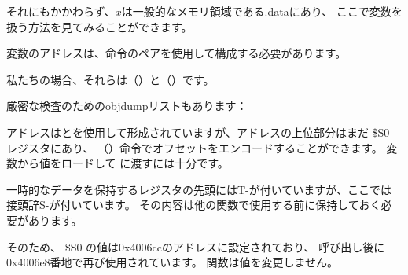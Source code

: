 それにもかかわらず、$x$は一般的なメモリ領域である.dataにあり、
ここで変数を扱う方法を見てみることができます。


変数のアドレスは、命令のペアを使用して構成する必要があります。

私たちの場合、それらは（）と（）です。 

厳密な検査のためのobjdumpリストもあります：




アドレスはとを使用して形成されていますが、アドレスの上位部分はまだ \$S0 レジスタにあり、
（）命令でオフセットをエンコードすることができます。 
変数から値をロードして \printf に渡すには十分です。

一時的なデータを保持するレジスタの先頭にはT-が付いていますが、ここでは接頭辞S-が付いています。
その内容は他の関数で使用する前に保持しておく必要があります。

そのため、 \$S0 の値は0x4006ccのアドレスに設定されており、
\scanf 呼び出し後に0x4006e8番地で再び使用されています。 
\scanf 関数は値を変更しません。

